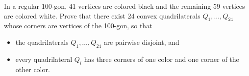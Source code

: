 In a regular 100-gon, 41 vertices are colored black and the remaining 59 vertices are colored white. Prove that there exist 24 convex quadrilaterals $Q_1, \ldots, Q_{24}$ whose corners are vertices of the 100-gon, so that
\begin{itemize}
\item the quadrilaterals $Q_1, \ldots, Q_{24}$ are pairwise disjoint, and
\item every quadrilateral $Q_i$ has three corners of one color and one corner of the other color.
\end{itemize}

